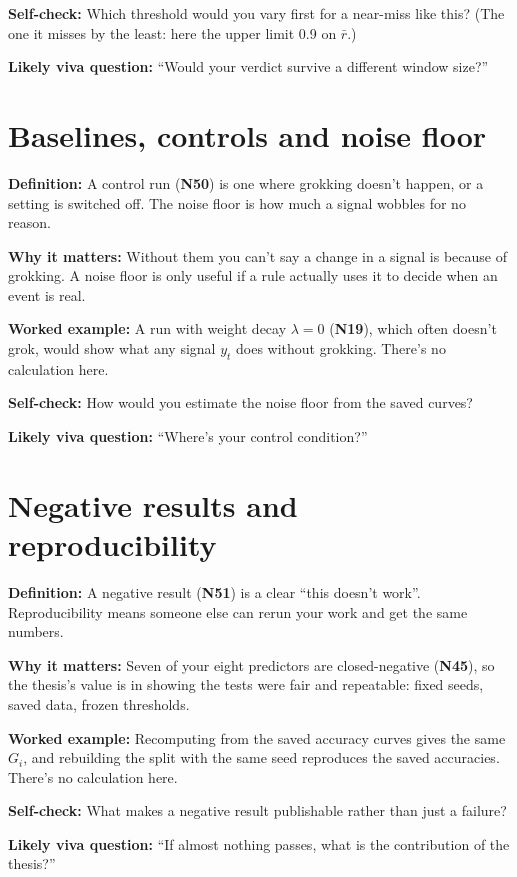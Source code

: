 \documentclass[11pt,a4paper,oneside,openany]{report}
\newcommand{\rbar}{\bar{r}}
\newcommand{\gl}[1]{\textbf{#1}}   %
\newcommand{\fdef}{\textbf{Definition:} }
\newcommand{\fwhy}{\par\textbf{Why it matters:} }
\newcommand{\fex}{\par\textbf{Worked example:} }
\newcommand{\fself}{\par\textbf{Self-check:} }
\newcommand{\fviva}{\par\textbf{Likely viva question:} }
\begin{document}
\fself Which threshold would you vary first for a near-miss like this? (The one it misses by the least: here the upper limit 0.9 on $\rbar$.)
\fviva ``Would your verdict survive a different window size?''

\section{Baselines, controls and noise floor}
\fdef A control run (\gl{N50}) is one where grokking doesn't happen, or a setting is switched off. The noise floor is how much a signal wobbles for no reason.
\fwhy Without them you can't say a change in a signal is because of grokking. A noise floor is only useful if a rule actually uses it to decide when an event is real.
\fex A run with weight decay $\lambda = 0$ (\gl{N19}), which often doesn't grok, would show what any signal $y_t$ does without grokking. There's no calculation here.
\fself How would you estimate the noise floor from the saved curves?
\fviva ``Where's your control condition?''

\section{Negative results and reproducibility}
\fdef A negative result (\gl{N51}) is a clear ``this doesn't work''. Reproducibility means someone else can rerun your work and get the same numbers.
\fwhy Seven of your eight predictors are closed-negative (\gl{N45}), so the thesis's value is in showing the tests were fair and repeatable: fixed seeds, saved data, frozen thresholds.
\fex Recomputing from the saved accuracy curves gives the same $G_i$, and rebuilding the split with the same seed reproduces the saved accuracies. There's no calculation here.
\fself What makes a negative result publishable rather than just a failure?
\fviva ``If almost nothing passes, what is the contribution of the thesis?''
\end{document}
